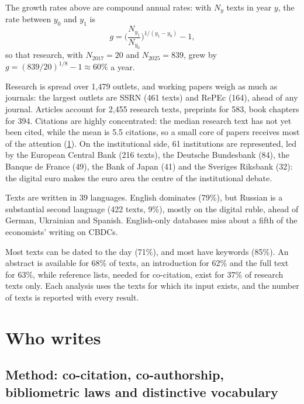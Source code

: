 \documentclass[11pt,a4paper]{article}
\begin{document}
The growth rates above are compound annual rates: with $N_y$ texts in year $y$, the rate between $y_0$ and $y_1$ is
\begin{equation}\label{eq:growth}
g = \Big(\frac{N_{y_1}}{N_{y_0}}\Big)^{1/(y_1 - y_0)} - 1 ,
\end{equation}
so that research, with $N_{2017} = 20$ and $N_{2025} = 839$, grew by $g = (839/20)^{1/8} - 1 \approx 60\%$ a year.



Research is spread over 1{,}479 outlets, and working 
papers weigh as much as journals: the largest outlets are SSRN (461 texts) 
and RePEc (164), ahead of any journal. Articles account for 2{,}455 research 
texts, preprints for 583, book chapters for 394. Citations are highly 
concentrated: the median research text has not yet been cited, while the 
mean is 5.5 citations, so a small core of papers receives most of the 
attention (\cref{sec:who}). On the institutional side, 61 institutions 
are represented, led by the European Central Bank (216 texts), the Deutsche 
Bundesbank (84), the Banque de France (49), the Bank of Japan (41) and the 
Sveriges Riksbank (32): the digital euro makes the euro area the centre of 
the institutional debate.

Texts are written in 39 languages. English dominates (79\%), but Russian 
is a substantial second language (422 texts, 9\%), mostly on 
the digital ruble, ahead of German, Ukrainian and Spanish. English-only 
databases miss about a fifth of the economists' writing on 
CBDCs.

Most texts can be dated to the day (71\%), and most have keywords 
(85\%). An abstract is available for 68\% of texts, an introduction 
for 62\% and the full text for 63\%, while reference lists, needed 
for co-citation, exist for 37\% of research texts only. Each analysis 
uses the texts for which its input exists, and the number 
of texts is reported with every result.



\section{Who writes}\label{sec:who}
\subsection{Method: co-citation, co-authorship, bibliometric laws and distinctive vocabulary}
\end{document}
